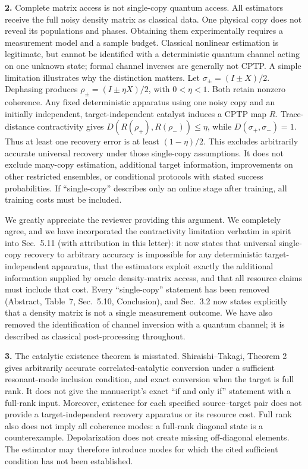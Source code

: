\documentclass[11pt,a4paper]{article}
\newcommand{\rev}[1]{{\color{black}#1}}
\newcommand{\resp}[1]{{\color{red}#1}}
\begin{document}
\rev{\textbf{2.} Complete matrix access is not single-copy quantum access. All estimators receive the full noisy density matrix as classical data. One physical copy does not reveal its populations and phases. Obtaining them experimentally requires a measurement model and a sample budget. Classical nonlinear estimation is legitimate, but cannot be identified with a deterministic quantum channel acting on one unknown state; formal channel inverses are generally not CPTP. A simple limitation illustrates why the distinction matters. Let $\sigma_\pm = (I \pm X)/2$. Dephasing produces $\rho_\pm = (I \pm \eta X)/2$, with $0 < \eta < 1$. Both retain nonzero coherence. Any fixed deterministic apparatus using one noisy copy and an initially independent, target-independent catalyst induces a CPTP map $R$. Trace-distance contractivity gives $D(R(\rho_+), R(\rho_-)) \leq \eta$, while $D(\sigma_+, \sigma_-) = 1$. Thus at least one recovery error is at least $(1 - \eta)/2$. This excludes arbitrarily accurate universal recovery under those single-copy assumptions. It does not exclude many-copy estimation, additional target information, improvements on other restricted ensembles, or conditional protocols with stated success probabilities. If ``single-copy'' describes only an online stage after training, all training costs must be included.}

\resp{We greatly appreciate the reviewer providing this argument. We completely agree, and we have incorporated the contractivity limitation verbatim in spirit into Sec.~5.11 (with attribution in this letter): it now states that universal single-copy recovery to arbitrary accuracy is impossible for any deterministic target-independent apparatus, that the estimators exploit exactly the additional information supplied by oracle density-matrix access, and that all resource claims must include that cost. Every ``single-copy'' statement has been removed (Abstract, Table~7, Sec.~5.10, Conclusion), and Sec.~3.2 now states explicitly that a density matrix is not a single measurement outcome. We have also removed the identification of channel inversion with a quantum channel; it is described as classical post-processing throughout.}

\rev{\textbf{3.} The catalytic existence theorem is misstated. Shiraishi--Takagi, Theorem 2 gives arbitrarily accurate correlated-catalytic conversion under a sufficient resonant-mode inclusion condition, and exact conversion when the target is full rank. It does not give the manuscript's exact ``if and only if'' statement with a full-rank input. Moreover, existence for each specified source--target pair does not provide a target-independent recovery apparatus or its resource cost. Full rank also does not imply all coherence modes: a full-rank diagonal state is a counterexample. Depolarization does not create missing off-diagonal elements. The estimator may therefore introduce modes for which the cited sufficient condition has not been established.}
\end{document}
